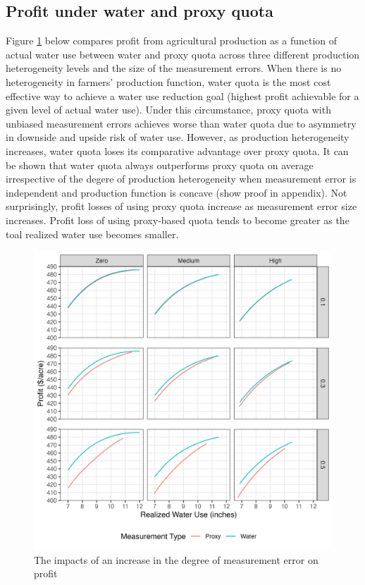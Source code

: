 \documentclass[
]{article}
\begin{document}
\subsection{Profit under water and proxy quota}\label{profit-under-water-and-proxy-quota}

Figure \ref{fig:profit-quota-water-het} below compares profit from agricultural production as a function of actual water use between water and proxy quota across three different production heterogeneity levels and the size of the measurement errors. When there is no heterogeneity in farmers' production function, water quota is the most cost effective way to achieve a water use reduction goal (highest profit achievable for a given level of actual water use). Under this circumstance, proxy quota with unbiased measurement errors achieves worse than water quota due to asymmetry in downside and upside risk of water use. However, as production heterogeneity increases, water quota loses its comparative advantage over proxy quota. It can be shown that water quota always outperforms proxy quota on average irrespective of the degere of production heterogeneity when measurement error is independent and production function is concave (show proof in appendix). Not surprisingly, profit losses of using proxy quota increase as measurement error size increases. Profit loss of using proxy-based quota tends to become greater as the toal realized water use becomes smaller.

\begin{figure}[H]

{\centering \includegraphics{figures/g_profit_quota_comp_stat} 

}

\caption{The impacts of an increase in the degree of measurement error on profit}\label{fig:profit-quota-water-het}
\end{figure}
\end{document}
